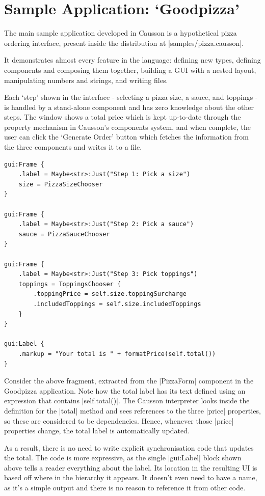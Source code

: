 \documentclass[11pt]{report}
\begin{document}
\section{Sample Application: `Goodpizza'}

The main sample application developed in Causson is a hypothetical pizza ordering interface, present inside the distribution at |samples/pizza.causson|.

It demonstrates almost every feature in the language: defining new types, defining components and composing them together, building a GUI with a nested layout, manipulating numbers and strings, and writing files.

Each `step' shown in the interface - selecting a pizza size, a sauce, and toppings - is handled by a stand-alone component and has zero knowledge about the other steps. The window shows a total price which is kept up-to-date through the property mechanism in Causson's components system, and when complete, the user can click the `Generate Order' button which fetches the information from the three components and writes it to a file.

\begin{Verbatim}
gui:Frame {
    .label = Maybe<str>:Just("Step 1: Pick a size")
    size = PizzaSizeChooser
}

gui:Frame {
    .label = Maybe<str>:Just("Step 2: Pick a sauce")
    sauce = PizzaSauceChooser
}

gui:Frame {
    .label = Maybe<str>:Just("Step 3: Pick toppings")
    toppings = ToppingsChooser {
        .toppingPrice = self.size.toppingSurcharge
        .includedToppings = self.size.includedToppings
    }
}

gui:Label {
    .markup = "Your total is " + formatPrice(self.total())
}
\end{Verbatim}

Consider the above fragment, extracted from the |PizzaForm| component in the Goodpizza application. Note how the total label has its text defined using an expression that contains |self.total()|. The Causson interpreter looks inside the definition for the |total| method and sees references to the three |price| properties, so these are considered to be dependencies. Hence, whenever those |price| properties change, the total label is automatically updated.

As a result, there is no need to write explicit synchronisation code that updates the total. The code is more expressive, as the single |gui:Label| block shown above tells a reader everything about the label. Its location in the resulting UI is based off where in the hierarchy it appears. It doesn't even need to have a name, as it's a simple output and there is no reason to reference it from other code.
\end{document}
